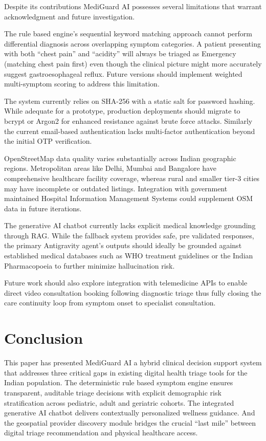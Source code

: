 \documentclass[conference]{IEEEtran}
\begin{document}
Despite its contributions MediGuard AI possesses several limitations that warrant acknowledgment and future investigation.

The rule based engine's sequential keyword matching approach cannot perform differential diagnosis across overlapping symptom categories. A patient presenting with both ``chest pain'' and ``acidity'' will always be triaged as Emergency (matching chest pain first) even though the clinical picture might more accurately suggest gastroesophageal reflux. Future versions should implement weighted multi-symptom scoring to address this limitation.

The system currently relies on SHA-256 with a static salt for password hashing. While adequate for a prototype, production deployments should migrate to bcrypt or Argon2 for enhanced resistance against brute force attacks. Similarly the current email-based authentication lacks multi-factor authentication beyond the initial OTP verification.

OpenStreetMap data quality varies substantially across Indian geographic regions. Metropolitan areas like Delhi, Mumbai and Bangalore have comprehensive healthcare facility coverage, whereas rural and smaller tier-3 cities may have incomplete or outdated listings. Integration with government maintained Hospital Information Management Systems could supplement OSM data in future iterations.

The generative AI chatbot currently lacks explicit medical knowledge grounding through RAG. While the fallback system provides safe, pre validated responses, the primary Antigravity agent's outputs should ideally be grounded against established medical databases such as WHO treatment guidelines or the Indian Pharmacopoeia to further minimize hallucination risk.

Future work should also explore integration with telemedicine APIs to enable direct video consultation booking following diagnostic triage thus fully closing the care continuity loop from symptom onset to specialist consultation.

\section{Conclusion}

This paper has presented MediGuard AI a hybrid clinical decision support system that addresses three critical gaps in existing digital health triage tools for the Indian population. The deterministic rule based symptom engine ensures transparent, auditable triage decisions with explicit demographic risk stratification across pediatric, adult and geriatric cohorts. The integrated generative AI chatbot delivers contextually personalized wellness guidance. And the geospatial provider discovery module bridges the crucial ``last mile'' between digital triage recommendation and physical healthcare access.
\end{document}
